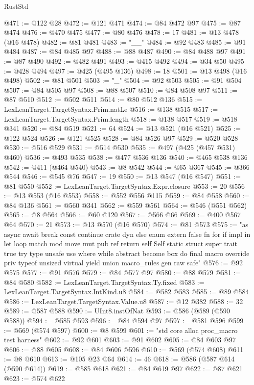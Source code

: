 \begin{lexlean}{RustStd}
\begin{coremodule}
@471 := @122 @28
@472 := @121 @471
@474 := @84 @472 @97
@475 := @87 @474
@476 := @470 @475
@477 := @80 @476
@478 := 17
@481 := @13 @478 (@16 @478)
@482 := @81 @481
@483 := "__"
@484 := @92 @483
@485 := @91 @484
@487 := @84 @485 @97
@488 := @88 @487
@490 := @84 @488 @97
@491 := @87 @490
@492 := @482 @491
@493 := @415 @492
@494 := @34 @50
@495 := @428 @494
@497 := @425 (@495 @136)
@498 := 18
@501 := @13 @498 (@16 @498)
@502 := @81 @501
@503 := "_"
@504 := @92 @503
@505 := @91 @504
@507 := @84 @505 @97
@508 := @88 @507
@510 := @84 @508 @97
@511 := @87 @510
@512 := @502 @511
@514 := @80 @512 @136
@515 := LexLeanTarget.TargetSyntax.Prim.natLe
@516 := @138 @515
@517 := LexLeanTarget.TargetSyntax.Prim.length
@518 := @138 @517
@519 := @518 @341
@520 := @84 @519
@521 := 64
@524 := @13 @521 (@16 @521)
@525 := @122 @524
@526 := @121 @525
@528 := @84 @526 @97
@529 := @520 @528
@530 := @516 @529
@531 := @514 @530
@535 := @497 (@425 (@457 @531) @460)
@536 := @493 @535
@538 := @477 @536 @136
@540 := @465 @538 @136
@542 := @411 (@464 @540)
@543 := @8 @542
@544 := @65 @367
@545 := @366 @544
@546 := @545 @76
@547 := 19
@550 := @13 @547 (@16 @547)
@551 := @81 @550
@552 := LexLeanTarget.TargetSyntax.Expr.closure
@553 := 20
@556 := @13 @553 (@16 @553)
@558 := @552 @556 @115
@559 := @84 @558
@560 := @84 @136
@561 := @560 @341
@562 := @559 @561
@564 := @546 (@551 @562)
@565 := @8 @564
@566 := @60 @120
@567 := @566 @66
@569 := @400 @567 @64
@570 := 21
@573 := @13 @570 (@16 @570)
@574 := @81 @573
@575 := "as async await break const continue crate dyn else enum extern false fn for if impl in let loop match mod move mut pub ref return self Self static struct super trait true try type unsafe use where while abstract become box do final macro override priv typeof unsized virtual yield union macro_rules gen raw safe"
@576 := @92 @575
@577 := @91 @576
@579 := @84 @577 @97
@580 := @88 @579
@581 := @84 @580
@582 := LexLeanTarget.TargetSyntax.Ty.fixed
@583 := LexLeanTarget.TargetSyntax.IntKind.u8
@584 := @582 @583
@585 := @89 @584
@586 := LexLeanTarget.TargetSyntax.Value.u8
@587 := @12 @382
@588 := 32
@589 := @587 @588
@590 := UInt8.instOfNat
@593 := @586 (@589 (@590 @588))
@594 := @585 @593
@596 := @84 @594 @97
@597 := @581 @596
@599 := @569 (@574 @597)
@600 := @8 @599
@601 := "std core alloc proc_macro test harness"
@602 := @92 @601
@603 := @91 @602
@605 := @84 @603 @97
@606 := @88 @605
@608 := @84 @606 @596
@610 := @569 (@574 @608)
@611 := @8 @610
@613 := @105 @23 @64
@614 := 46
@618 := @586 (@587 @614 (@590 @614))
@619 := @585 @618
@621 := @84 @619 @97
@622 := @87 @621
@623 := @574 @622

\end{coremodule}
\end{lexlean}
